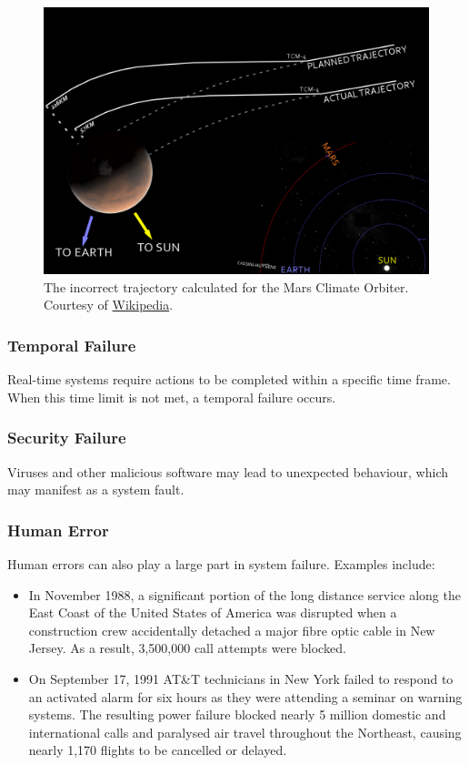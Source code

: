 \begin{figure}
\centering
\includegraphics[width=0.7\linewidth]{figures/Mars_Climate_Orbiter_-_mishap_diagram}
\caption[Mars Climate Orbiter wrong trajectory]{The incorrect trajectory calculated for the Mars Climate Orbiter. Courtesy of \href{https://en.wikipedia.org/wiki/Mars_Climate_Orbiter\#/media/File:Mars_Climate_Orbiter_-_mishap_diagram.png}{Wikipedia}.}
\label{fig:marsclimateorbiter-mishapdiagram}
\end{figure}

\subsubsection{Temporal Failure}
Real-time systems require actions to be completed within a specific time frame. When this time limit is not met, a temporal failure occurs.

\subsubsection{Security Failure}
Viruses and other malicious software may lead to unexpected behaviour, which may manifest as a system fault. 

\subsubsection{Human Error}
Human errors can also play a large part in system failure. Examples include: \begin{itemize}
\item In November 1988, a significant portion of the long distance service along the East Coast of the United States of America was disrupted when a construction crew accidentally detached a major fibre optic cable in New Jersey. As a result, 3,500,000 call attempts were blocked. 
\item On September 17, 1991 AT\&T technicians in New York failed to respond to an activated alarm for six hours as they were attending a seminar on warning systems. The resulting power failure blocked nearly 5 million domestic and international calls and paralysed air travel throughout the Northeast, causing nearly 1,170 flights to be cancelled or delayed. 
\end{itemize}

